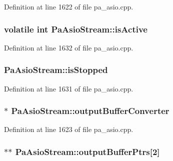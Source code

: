 Definition at line 1622 of file pa\+\_\+asio.\+cpp.

\subsubsection[{\texorpdfstring{is\+Active}{isActive}}]{\setlength{\rightskip}{0pt plus 5cm}volatile {\bf int} Pa\+Asio\+Stream\+::is\+Active}\hypertarget{struct_pa_asio_stream_a58968563c91f34801e82f695ca1ad7bc}{}\label{struct_pa_asio_stream_a58968563c91f34801e82f695ca1ad7bc}


Definition at line 1632 of file pa\+\_\+asio.\+cpp.

\subsubsection[{\texorpdfstring{is\+Stopped}{isStopped}}]{ Pa\+Asio\+Stream\+::is\+Stopped}\hypertarget{struct_pa_asio_stream_a32266ca70b73b4bad7c7605ff6308ac7}{}\label{struct_pa_asio_stream_a32266ca70b73b4bad7c7605ff6308ac7}


Definition at line 1631 of file pa\+\_\+asio.\+cpp.

\subsubsection[{\texorpdfstring{output\+Buffer\+Converter}{outputBufferConverter}}]{$\ast$ Pa\+Asio\+Stream\+::output\+Buffer\+Converter}\hypertarget{struct_pa_asio_stream_a554712919295460d9e88a03c32c8fb9a}{}\label{struct_pa_asio_stream_a554712919295460d9e88a03c32c8fb9a}


Definition at line 1623 of file pa\+\_\+asio.\+cpp.

\subsubsection[{\texorpdfstring{output\+Buffer\+Ptrs}{outputBufferPtrs}}]{$\ast$$\ast$ Pa\+Asio\+Stream\+::output\+Buffer\+Ptrs\mbox{[}2\mbox{]}}\hypertarget{struct_pa_asio_stream_a96357cfec93b4ff57750eb15467dc36a}{}\label{struct_pa_asio_stream_a96357cfec93b4ff57750eb15467dc36a}


